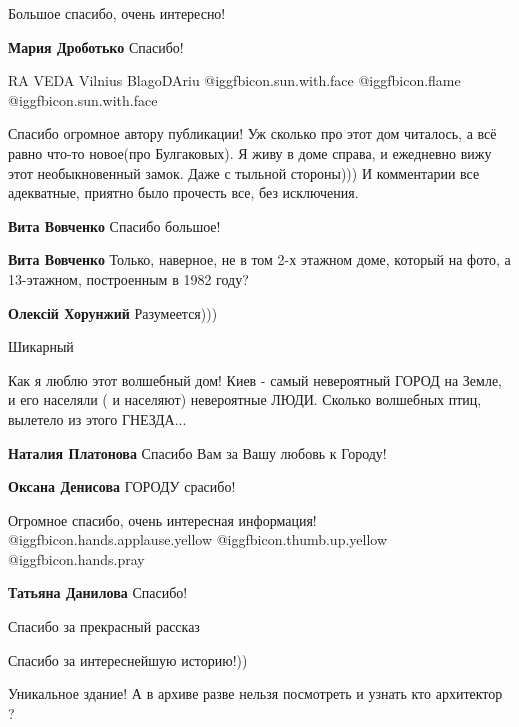 \begin{itemize}
Большое спасибо, очень интересно!

\textbf{Мария Дроботько} Спасибо!

RA VEDA Vilnius BlagoDAriu @igg{fbicon.sun.with.face}  @igg{fbicon.flame}  @igg{fbicon.sun.with.face} 


Спасибо огромное автору публикации! Уж сколько про этот дом читалось, а всё
равно что-то новое(про Булгаковых). Я живу в доме справа, и ежедневно вижу этот
необыкновенный замок. Даже с тыльной стороны))) И комментарии все адекватные,
приятно было прочесть все, без исключения.

\begin{itemize} %
\textbf{Вита Вовченко} Спасибо большое!

\textbf{Вита Вовченко} Только, наверное, не в том 2-х этажном доме, который на фото, а 13-этажном, построенным в 1982 году?

\textbf{Олексій Хорунжий} Разумеется)))
\end{itemize} %

Шикарный


Как я люблю этот волшебный дом! Киев - самый невероятный ГОРОД на Земле, и его
населяли ( и населяют) невероятные ЛЮДИ. Сколько волшебных птиц, вылетело из
этого ГНЕЗДА...

\begin{itemize} %
\textbf{Наталия Платонова} Спасибо Вам за Вашу любовь к Городу!

\textbf{Оксана Денисова} ГОРОДУ срасибо!
\end{itemize} %


Огромное спасибо, очень интересная информация!
@igg{fbicon.hands.applause.yellow}  @igg{fbicon.thumb.up.yellow}
@igg{fbicon.hands.pray} 

\textbf{Татьяна Данилова} Спасибо!

Спасибо за прекрасный рассказ

Спасибо за интереснейшую историю!))

Уникальное здание! А в архиве разве нельзя посмотреть и узнать кто архитектор ?


\end{itemize}
